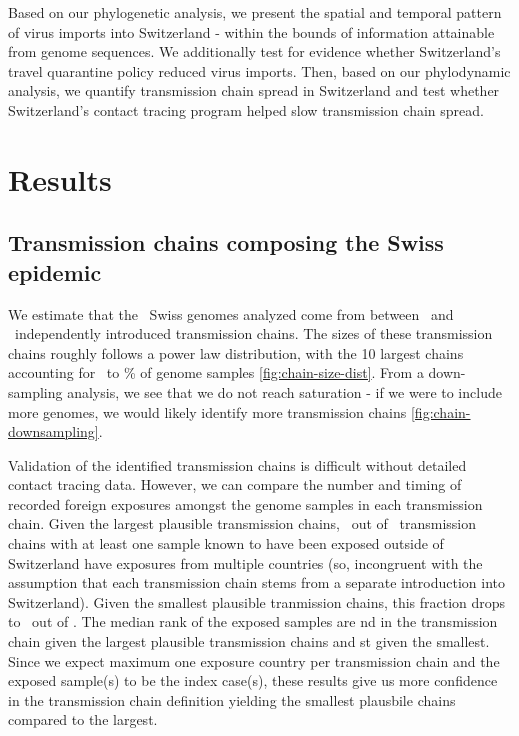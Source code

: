 \documentclass[9pt,twocolumn,twoside,lineno]{pnas-new}
\begin{document}
Based on our phylogenetic analysis, we present the spatial and temporal pattern of virus imports into Switzerland - within the bounds of information attainable from genome sequences. We additionally test for evidence whether Switzerland’s travel quarantine policy reduced virus imports. Then, based on our phylodynamic analysis, we quantify transmission chain spread in Switzerland and test whether Switzerland’s contact tracing program helped slow transmission chain spread.

\section{Results}

\subsection{Transmission chains composing the Swiss epidemic}

We estimate that the \nswissseqs\ Swiss genomes analyzed come from between \nchainsmin\ and \nchainsmax\ independently introduced transmission chains. The sizes of these transmission chains roughly follows a power law distribution, with the 10 largest chains accounting for \maxlargestchainsper\ to \minlargestchainsper \% of genome samples \ref{fig:chain-size-dist}. From a down-sampling analysis, we see that we do not reach saturation - if we were to include more genomes, we would likely identify more transmission chains \ref{fig:chain-downsampling}. 

Validation of the identified transmission chains is difficult without detailed contact tracing data. However, we can compare the number and timing of recorded foreign exposures amongst the genome samples in each transmission chain. Given the largest plausible transmission chains, \ncinongruentexposurechainsmin\ out of \nexposurechainsmin\ transmission chains with at least one sample known to have been exposed outside of Switzerland have exposures from multiple countries (so, incongruent with the assumption that each transmission chain stems from a separate introduction into Switzerland). Given the smallest plausible tranmission chains, this fraction drops to \ncinongruentexposurechainsmax\ out of \nexposurechainsmax. The median rank of the exposed samples are  \rankexpsamplemin nd in the transmission chain given the largest plausible transmission chains and \rankexpsamplemax st given the smallest. Since we expect maximum one exposure country per transmission chain and the exposed sample(s) to be the index case(s), these results give us more confidence in the transmission chain definition yielding the smallest plausbile chains compared to the largest.
\end{document}
